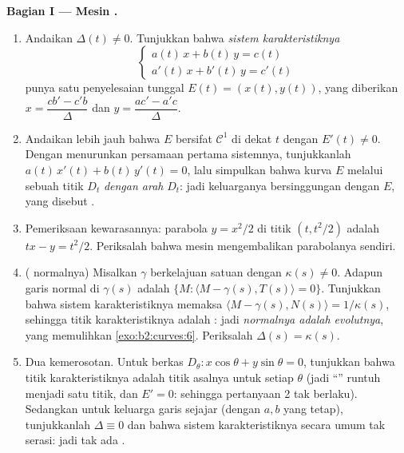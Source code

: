 \begin{problem}
\medskip
\noindent\textbf{Bagian I --- Mesin .}
\begin{enumerate}
  \item Andaikan $\Delta(t) \neq 0$. Tunjukkan bahwa \emph{sistem
        karakteristiknya}
        \[
        \begin{cases} a(t)\,x + b(t)\,y = c(t)\\
        a'(t)\,x + b'(t)\,y = c'(t)\end{cases}
        \]
        punya satu penyelesaian tunggal $E(t) = (x(t), y(t))$, yang diberikan
        $x = \dfrac{cb' - c'b}{\Delta}$ dan $y = \dfrac{ac' -
        a'c}{\Delta}$.
  \item Andaikan lebih jauh bahwa $E$ bersifat $\mathcal C^1$ di dekat $t$
        dengan $E'(t) \neq 0$. Dengan menurunkan persamaan pertama
        sistemnya, tunjukkanlah $a(t)\,x'(t) +
        b(t)\,y'(t) = 0$, lalu simpulkan bahwa kurva $E$
        melalui sebuah titik $D_t$ \emph{dengan arah}
        $D_t$: jadi keluarganya bersinggungan dengan $E$,
        yang disebut \emph{}.
  \item Pemeriksaan kewarasannya:  parabola $y =
        x^2/2$ di titik $(t, t^2/2)$ adalah $tx - y =
        t^2/2$. Periksalah bahwa mesin  mengembalikan
        parabolanya sendiri.
  \item ( normalnya) Misalkan $\gamma$ berkelajuan satuan
        dengan $\kappa(s) \neq 0$. Adapun garis normal di
        $\gamma(s)$ adalah $\{M : \langle M - \gamma(s), T(s)
        \rangle = 0\}$. Tunjukkan bahwa sistem karakteristiknya
        memaksa $\langle M - \gamma(s), N(s)\rangle =
        1/\kappa(s)$, sehingga titik karakteristiknya adalah
        : jadi \emph{
        normalnya adalah evolutnya}, yang memulihkan
        \cref{exo:b2:curves:6}. Periksalah $\Delta(s) =
        \kappa(s)$.
  \item Dua kemerosotan. Untuk berkas $D_\theta : x\cos
        \theta + y\sin\theta = 0$, tunjukkan bahwa
        titik karakteristiknya adalah titik asalnya untuk setiap $\theta$
        (jadi ``'' runtuh menjadi satu titik, dan $E' = 0$:
        sehingga pertanyaan 2 tak berlaku). Sedangkan untuk keluarga garis sejajar
        (dengan $a, b$ yang tetap), tunjukkanlah $\Delta \equiv 0$ dan
        bahwa sistem karakteristiknya secara umum
        tak serasi: jadi tak ada .
\end{enumerate}


\end{problem}
